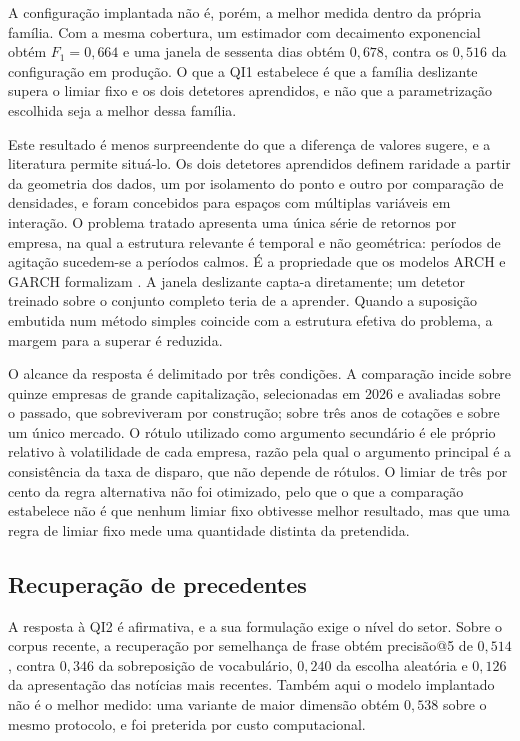 A configuração implantada não é, porém, a melhor medida dentro da própria família. Com a mesma
cobertura, um estimador com decaimento exponencial obtém $F_1 = 0{,}664$ e uma janela de sessenta
dias obtém $0{,}678$, contra os $0{,}516$ da configuração em produção. O que a \gls{QI}1 estabelece
é que a família deslizante supera o limiar fixo e os dois detetores aprendidos, e não que a
parametrização escolhida seja a melhor dessa família.

Este resultado é menos surpreendente do que a diferença de valores sugere, e a literatura permite
situá-lo. Os dois detetores aprendidos definem raridade a partir da geometria dos dados, um por
isolamento do ponto e outro por comparação de densidades, e foram concebidos para espaços com
múltiplas variáveis em interação. O problema tratado apresenta uma única série de retornos por empresa, na qual a estrutura
relevante é temporal e não geométrica: períodos de agitação sucedem-se a períodos calmos. É a
propriedade que os modelos \gls{ARCH} e \gls{GARCH} formalizam \autocite{engle1982arch,
bollerslev1986garch}. A janela deslizante capta-a diretamente; um detetor treinado sobre o
conjunto completo teria de a aprender. Quando a suposição embutida
num método simples coincide com a estrutura efetiva do problema, a margem para a superar é reduzida.

O alcance da resposta é delimitado por três condições. A comparação incide sobre quinze empresas de
grande capitalização, selecionadas em 2026 e avaliadas sobre o passado, que sobreviveram por
construção; sobre três anos de cotações e sobre um único mercado. O rótulo utilizado como argumento
secundário é ele próprio relativo à volatilidade de cada empresa, razão pela qual o argumento
principal é a consistência da taxa de disparo, que não depende de rótulos. O limiar de três por cento
da regra alternativa não foi otimizado, pelo que o que a comparação estabelece não é que nenhum
limiar fixo obtivesse melhor resultado, mas que uma regra de limiar fixo mede uma quantidade distinta
da pretendida.

\subsection{Recuperação de precedentes}

A resposta à \gls{QI}2 é afirmativa, e a sua formulação exige o nível do setor. Sobre o corpus
recente, a recuperação por semelhança de frase \autocite{reimers2019sbert} obtém precisão@5 de
$0{,}514$, contra $0{,}346$ da sobreposição de vocabulário, $0{,}240$ da escolha aleatória e
$0{,}126$ da apresentação das notícias mais recentes. Também aqui o modelo implantado não é o melhor
medido: uma variante de maior dimensão obtém $0{,}538$ sobre o mesmo protocolo, e foi preterida por
custo computacional.

